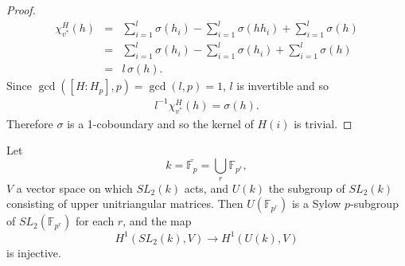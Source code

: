 \begin{proof}
\begin{eqnarray*}
	\chi_{v^*}^H(h) &=& \sum_{i = 1}^l\sigma(h_i) - \sum_{i = 1}^l \sigma(hh_i) +\sum_{i = 1}^l \sigma(h)\\
	&=& \sum_{i = 1}^l\sigma(h_i) - \sum_{i = 1}^l \sigma(h_i) +\sum_{i = 1}^l \sigma(h) \\
	&=& l\, \sigma(h).
\end{eqnarray*}
Since $\gcd([H:H_p], p) = \gcd(l,p) = 1$, $l$ is invertible and so
\begin{eqnarray*}
	l^{-1}\chi_{v^*}^H(h) = \sigma(h).
\end{eqnarray*}
Therefore $\sigma$ is a 1-coboundary and so the kernel of $H(i)$ is trivial.
\end{proof}

\begin{example}
	Let
	\begin{displaymath}
		k = \bar{\mathbb{F}_p} = \bigcup_r \mathbb{F}_{p^r},
	\end{displaymath}
	$V$ a vector space on which $SL_2(k)$ acts, and $U(k)$ the subgroup of $SL_2(k)$ consisting of upper unitriangular matrices. Then $U(\mathbb{F}_{p^r})$ is a Sylow $p$-subgroup of $SL_2(\mathbb{F}_{p^r})$ for each $r$, and the map
	\begin{displaymath}
		H^1(SL_2(k), V) \rightarrow H^1(U(k), V)
	\end{displaymath}
	is injective.
\end{example}
